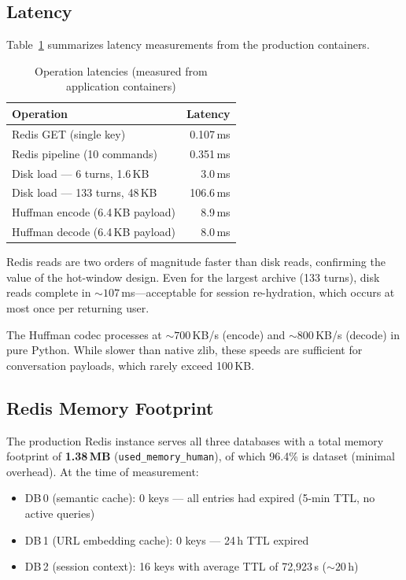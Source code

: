 \documentclass[conference]{IEEEtran}
\begin{document}
\subsection{Latency}

Table~\ref{tab:latency} summarizes latency measurements from the production containers.

\begin{table}[h]
\centering
\caption{Operation latencies (measured from application containers)}
\label{tab:latency}
\begin{tabular}{lr}
\toprule
\textbf{Operation} & \textbf{Latency} \\
\midrule
Redis GET (single key) & 0.107\,ms \\
Redis pipeline (10 commands) & 0.351\,ms \\
Disk load --- 6 turns, 1.6\,KB & 3.0\,ms \\
Disk load --- 133 turns, 48\,KB & 106.6\,ms \\
Huffman encode (6.4\,KB payload) & 8.9\,ms \\
Huffman decode (6.4\,KB payload) & 8.0\,ms \\
\bottomrule
\end{tabular}
\end{table}

Redis reads are two orders of magnitude faster than disk reads, confirming the value of the hot-window design. Even for the largest archive (133 turns), disk reads complete in ${\sim}107$\,ms---acceptable for session re-hydration, which occurs at most once per returning user.

The Huffman codec processes at ${\sim}700$\,KB/s (encode) and ${\sim}800$\,KB/s (decode) in pure Python. While slower than native zlib, these speeds are sufficient for conversation payloads, which rarely exceed 100\,KB.

\subsection{Redis Memory Footprint}

The production Redis instance serves all three databases with a total memory footprint of \textbf{1.38\,MB} (\texttt{used\_memory\_human}), of which 96.4\% is dataset (minimal overhead). At the time of measurement:

\begin{itemize}
\item DB\,0 (semantic cache): 0 keys --- all entries had expired (5-min TTL, no active queries)
\item DB\,1 (URL embedding cache): 0 keys --- 24\,h TTL expired
\item DB\,2 (session context): 16 keys with average TTL of 72{,}923\,s (${\sim}20$\,h)
\end{itemize}
\end{document}

